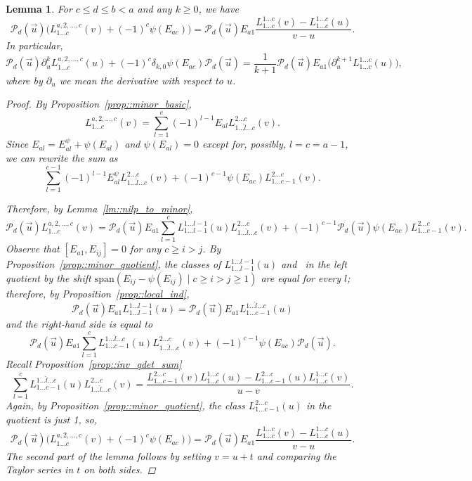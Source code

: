 \documentclass[10pt,a4paper]{article}
\numberwithin{equation}{section}
\newtheorem{Lemma}[Theorem]{Lemma}
\newcommand{\calP}{\mathcal{P}}
\begin{document}
	\begin{Lemma}
		\label{lm::minor_der}
		For $c \leq d \leq b < a$ and any $k\geq 0$, we have
		\[
		\calP_d(\vec{u}) \bigl(L_{1\dots c}^{a,2,\dots,c}(v) + (-1)^c \psi(E_{ac})\bigr) = \calP_d(\vec{u}) E_{a1} \frac{L_{1\dots c}^{1\dots c}(v) - L_{1\dots c}^{1\dots c}(u)}{v-u}.
		\]
		In particular,
		\[
		\calP_d(\vec{u}) \partial_u^k L_{1\dots c}^{a,2,\dots, c}(u) + (-1)^c \delta_{k,0} \psi(E_{ac}) \calP_d(\vec{u})= \frac{1}{k+1} \calP_d(\vec{u}) E_{a1} \bigl(\partial_u^{k+1} L_{1\dots c}^{1\dots c}(u)\bigr),
		\]
		where by $\partial_u$ we mean the derivative with respect to $u$.
		\begin{proof}
			By Proposition~\ref{prop::minor_basic},
			\[
			L_{1\dots c}^{a,2,\dots,c}(v) = \sum\limits_{l=1}^c (-1)^{l-1} E_{al} L_{1\dots \hat{l} \dots c}^{2 \dots c}(v).
			\]
			Since $E_{al} = E_{al}^{\psi} + \psi(E_{al})$ and $\psi(E_{al})=0$ except for, possibly, $l=c=a-1$, we can rewrite the sum as
			\[
			\sum\limits_{l=1}^{c-1} (-1)^{l-1} E^{\psi}_{al} L_{1\dots \hat{l} \dots c}^{2 \dots c}(v) + (-1)^{c-1} \psi(E_{ac}) L_{1\dots c-1}^{2\dots c}(v).
			\]
			
			Therefore, by Lemma~\ref{lm::nilp_to_minor},
			\[
			\calP_d(\vec{u}) L_{1\dots c}^{a,2,\dots, c}(v) = \calP_d(\vec{u}) E_{a1} \sum\limits_{l=1}^c L_{1\dots l-1}^{1\dots l-1}(u) L_{1\dots \hat{l} \dots c}^{2\dots c}(v) + (-1)^{c-1} \calP_d(\vec{u}) \psi(E_{ac}) L_{1\dots c-1}^{2\dots c}(v).
			\]
			Observe that $[E_{a1},E_{ij}]=0$ for any $c\geq i > j$. By Proposition~\ref{prop::minor_quotient}, the classes of $L_{1\dots l-1}^{1\dots l-1}(u)$ and~ in the left quotient by the shift $\mathrm{span}(E_{ij} - \psi(E_{ij})\mid c\geq i > j \geq 1)$ are equal for every $l$; therefore, by Proposition~\ref{prop::local_ind},
			\[
			\calP_d(\vec{u}) E_{a1} L_{1\dots l-1}^{1\dots l-1}(u) = \calP_d(\vec{u}) E_{a1} L_{1\dots c-1}^{1\dots \hat{l} \dots c}(u)
			\]
			and the right-hand side is equal to
			\[
			\calP_d(\vec{u}) E_{a1} \sum\limits_{l=1}^{c} L_{1\dots c-1}^{1\dots \hat{l} \dots c}(u) L_{1\dots \hat{l} \dots c}^{2\dots c}(v) + (-1)^{c-1} \psi(E_{ac}) \calP_d(\vec{u}).
			\]
			Recall Proposition~\ref{prop::inv_qdet_sum}
			\[
			\sum\limits_{l=1}^{c} L_{1\dots c-1}^{1\dots \hat{l} \dots c}(u) L_{1\dots \hat{l} \dots c}^{2\dots c}(v) = \frac{L_{1\dots c-1}^{2\dots c}(v) L_{1\dots c}^{1\dots c}(u) - L_{1\dots c-1}^{2\dots c}(u) L_{1\dots c}^{1\dots c}(v)}{u-v}.
			\]
			Again, by Proposition~\ref{prop::minor_quotient}, the class $L_{1\dots c-1}^{2\dots c}(u)$ in the quotient is just 1, so,
			\[
			\calP_d(\vec{u}) \bigl(L_{1\dots c}^{a,2,\dots,c}(v) + (-1)^c \psi(E_{ac})\bigr) = \calP_d(\vec{u}) E_{a1} \frac{L_{1\dots c}^{1\dots c}(v) - L_{1\dots c}^{1\dots c}(u)}{v-u}.
			\]
			The second part of the lemma follows by setting $v=u+t$ and comparing the Taylor series in $t$ on both sides.
		\end{proof}
	\end{Lemma}
	
\end{document}
